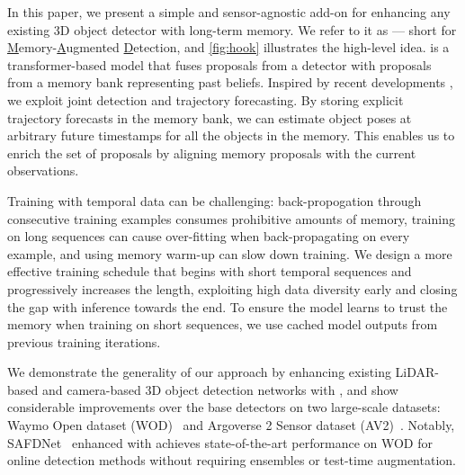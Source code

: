 In this paper, we present a simple and sensor-agnostic
add-on for enhancing any existing 3D object detector with long-term memory. We refer to it as \ourmodel{} --- short for \underline{M}emory-\underline{A}ugmented \underline{D}etection, and \cref{fig:hook} illustrates the high-level idea.
\ourmodel{} is a transformer-based model that fuses proposals from a detector with proposals from a memory bank representing past beliefs.
Inspired by recent developments \cite{casas2024detra}, we exploit joint detection and trajectory forecasting.
By storing explicit trajectory forecasts in the memory bank, we can estimate object poses at arbitrary future timestamps for all the objects in the memory.
This enables us to enrich the set of proposals by aligning memory proposals with the current observations.

Training with temporal data can be challenging:
back-propogation through consecutive training examples consumes prohibitive amounts of memory,
training on long sequences can cause over-fitting when back-propagating on every example,
and using memory warm-up can slow down training.
We design a more effective training schedule that begins with short temporal sequences and progressively increases the length, exploiting high data diversity early and closing the gap with inference towards the end.
To ensure the model learns to trust the memory when training on short sequences,
we use cached model outputs from previous training iterations.%

We demonstrate the generality of our approach by enhancing existing LiDAR-based and camera-based 3D object detection networks with \ourmodel{}, and show considerable improvements over the base detectors on two large-scale datasets: Waymo Open dataset (WOD)~\cite{WOD} and  Argoverse 2 Sensor dataset (AV2)~\cite{wilson2023argoverse}.
Notably, SAFDNet~\cite{safdnet} enhanced with \ourmodel{} achieves state-of-the-art performance on WOD for online detection methods without requiring ensembles or test-time augmentation.